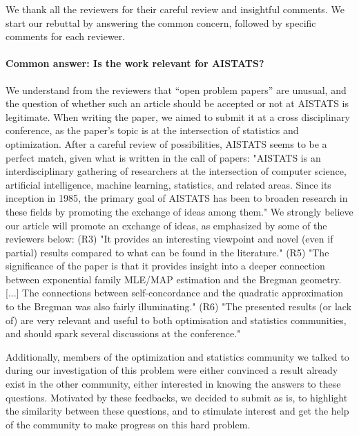 
\fi


We thank all the reviewers for their careful review and insightful comments. We start our rebuttal by answering the common concern, followed by specific comments for each reviewer.
	
\paragraph{Common answer: Is the work relevant for AISTATS?}
We understand from the reviewers that “open problem papers”  are unusual, and the question of whether such an article should be accepted or not at AISTATS is legitimate. 
When writing the paper, we aimed to submit it at a cross disciplinary conference, as the paper’s topic is at the intersection of statistics and optimization. After a careful review of possibilities, AISTATS seems to be a perfect match, given what is written in the call of papers:
"AISTATS is an interdisciplinary gathering of researchers at the intersection of computer science, artificial intelligence, machine learning, statistics, and related areas. Since its inception in 1985, the primary goal of AISTATS has been to broaden research in these fields by promoting the exchange of ideas among them."  
We strongly believe our article will promote an exchange of ideas, as emphasized by some of the reviewers below:
(R3) "It provides an interesting viewpoint and novel (even if partial) results compared to what can be found in the literature."
(R5)  "The significance of the paper is that it provides insight into a deeper connection between exponential family MLE/MAP estimation and the Bregman geometry. [...]  The connections between self-concordance and the quadratic approximation to the Bregman was also fairly illuminating."
(R6) "The presented results (or lack of) are very relevant and useful to both optimisation and statistics communities, and should spark several discussions at the conference."

Additionally, members of the optimization and statistics community we talked to during our investigation of this problem were 
either convinced a result already exist in the other community, 
either interested in knowing the answers to these questions.
Motivated by these feedbacks, we decided to submit as is, to highlight the similarity between these questions, 
and to stimulate interest and get the help of the community to make progress on this hard problem.


